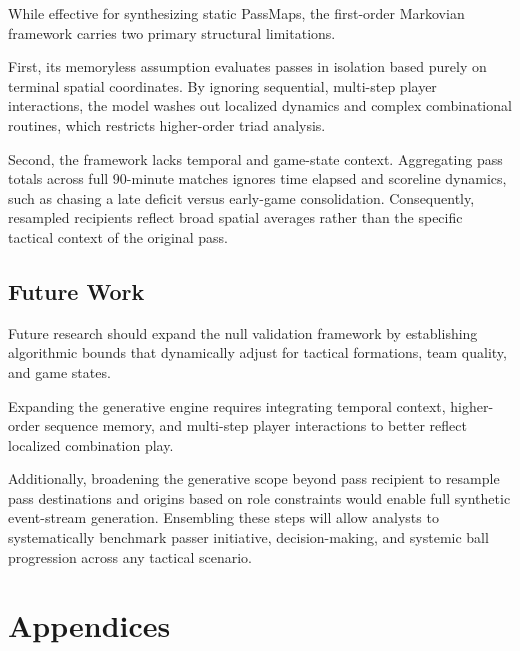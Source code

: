 \documentclass[12pt, a4paper]{article}
\begin{document}
While effective for synthesizing static PassMaps, the first-order Markovian framework carries two primary structural limitations. 

First, its memoryless assumption evaluates passes in isolation based purely on terminal spatial coordinates. By ignoring sequential, multi-step player interactions, the model washes out localized dynamics and complex combinational routines, which restricts higher-order triad analysis. 

Second, the framework lacks temporal and game-state context. Aggregating pass totals across full 90-minute matches ignores time elapsed and scoreline dynamics, such as chasing a late deficit versus early-game consolidation. Consequently, resampled recipients reflect broad spatial averages rather than the specific tactical context of the original pass.

\subsection{Future Work}
\label{subsec:future_work}

Future research should expand the null validation framework by establishing algorithmic bounds that dynamically adjust for tactical formations, team quality, and game states. 

Expanding the generative engine requires integrating temporal context, higher-order sequence memory, and multi-step player interactions to better reflect localized combination play. 

Additionally, broadening the generative scope beyond pass recipient to resample pass destinations and origins based on role constraints would enable full synthetic event-stream generation. Ensembling these steps will allow analysts to systematically benchmark passer initiative, decision-making, and systemic ball progression across any tactical scenario.











\newpage



\clearpage
\appendix
\section*{Appendices}
\end{document}
